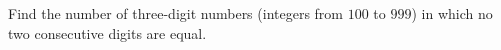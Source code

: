Find the number of three-digit numbers (integers from $100$ to $999$) in which no two consecutive digits are equal.
